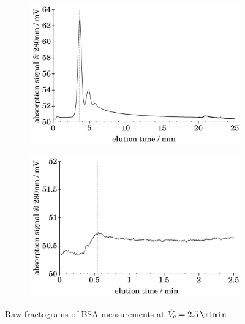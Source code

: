 \begin{figure}[h]
\begin{center}
  \begin{subfigure}{0.49\linewidth}
    \includegraphics[width=\linewidth]{./images/data/img_BSA_VC_2_5_r3_te.pdf}
    \label{subfig:raw_BSA2_5_r3_te}
  \end{subfigure}
  \begin{subfigure}{0.49\linewidth}
    \includegraphics[width=\linewidth]{./images/data/img_BSA_VC_2_5_r3_t0.pdf}
  \end{subfigure}
  \end{center}
  \vspace*{-3ex}    
  \caption[Raw fractograms of BSA measurements at $\Vc = \SI{2.5}{\mlmin}$]{Raw fractograms of BSA measurements at $\Vc 
  = \SI{2.5}{\mlmin}$}
  \label{fig:raw_BSA_2_5_UV} 
\end{figure}
